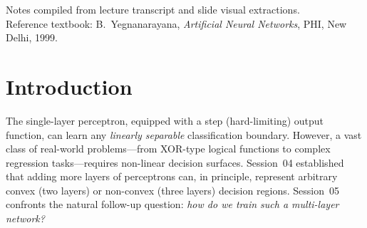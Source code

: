 \documentclass[12pt,a4paper]{article}
\newcommand{\Loss}{\mathcal{L}}
\begin{document}
\begin{titlepage}
  \begin{abstract}
    \noindent
    Session~05 extends the single-layer perceptron framework to
    \emph{multi-layer feedforward neural networks} (MLFFNNs).  The session
    opens with a recap of why linearly non-separable problems require hidden
    layers, then identifies the \emph{hard learning problem}: the perceptron
    learning rule cannot be applied to hidden-layer weights because no target
    output is available there.  The resolution is replacing the
    non-differentiable step function with \emph{differentiable sigmoidal
    activations} (logistic and hyperbolic tangent), enabling the
    \emph{backpropagation algorithm} (generalised delta rule) to propagate
    error gradients from the output layer back through every hidden layer via
    the chain rule.  A complete numerical forward pass on an IQ/CGPA
    prediction example (ReLU hidden activations, linear output) is worked
    through, followed by the derivation of the first backpropagation
    gradients $\partial\Loss/\partial v_1$, $\partial\Loss/\partial v_2$, and
    $\partial\Loss/\partial b_3$.
  \end{abstract}

  \vfill
  {\small Notes compiled from lecture transcript and slide visual extractions.\\
   Reference textbook: B.~Yegnanarayana, \emph{Artificial Neural Networks},
   PHI, New Delhi, 1999.}
\end{titlepage}

\tableofcontents
\newpage

\section{Introduction}
\label{sec:intro}

The single-layer perceptron, equipped with a step (hard-limiting) output
function, can learn any \emph{linearly separable} classification boundary.
However, a vast class of real-world problems---from XOR-type logical functions
to complex regression tasks---requires non-linear decision surfaces.
Session~04 established that adding more layers of perceptrons can, in
principle, represent arbitrary convex (two layers) or non-convex (three
layers) decision regions.  Session~05 confronts the natural follow-up
question: \emph{how do we train such a multi-layer network?}
\end{document}
